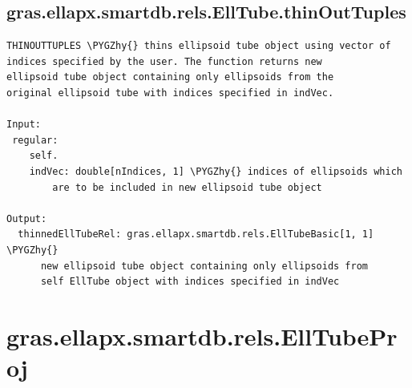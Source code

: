 \documentclass[letterpaper,10pt,english]{sphinxmanual}
\def\PYGZhy{\char`\-}
\begin{document}
\subsection{gras.ellapx.smartdb.rels.EllTube.thinOutTuples}
\label{chap_functions:gras-ellapx-smartdb-rels-elltube-thinouttuples}
\begin{Verbatim}[commandchars=\\\{\}]
THINOUTTUPLES \PYGZhy{} thins ellipsoid tube object using vector of
indices specified by the user. The function returns new
ellipsoid tube object containing only ellipsoids from the
original ellipsoid tube with indices specified in indVec.

Input:
 regular:
    self.
    indVec: double[nIndices, 1] \PYGZhy{} indices of ellipsoids which
        are to be included in new ellipsoid tube object

Output:
  thinnedEllTubeRel: gras.ellapx.smartdb.rels.EllTubeBasic[1, 1] \PYGZhy{}
      new ellipsoid tube object containing only ellipsoids from
      self EllTube object with indices specified in indVec
\end{Verbatim}


\section{gras.ellapx.smartdb.rels.EllTubeProj}
\label{chap_functions:gras-ellapx-smartdb-rels-elltubeproj}
\end{document}
